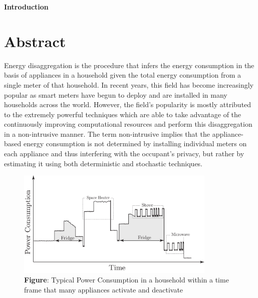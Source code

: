 \documentclass[landscape,fontscale=0.48,margin=2cm,paperwidth=135truecm,paperheight=89truecm]{baposter}
\begin{document}
\begin{poster}
\begin{posterbox}[column=0]{\LARGE \bfseries Introduction}
\section*{Abstract}
Energy disaggregation is the procedure that infers the energy consumption in the basis of appliances in a household given the total energy consumption from a single meter of that household. In recent years, this field has become increasingly popular as smart meters have begun to deploy and are installed in many households across the world. However, the field's popularity is mostly attributed to the extremely powerful techniques which are able to take advantage of the continuously improving computational resources and perform this disaggregation in a non-intrusive manner. The term non-intrusive implies that the appliance-based energy consumption is not determined by installing individual meters on each appliance and thus interfering with the occupant's privacy, but rather by estimating it using both deterministic and stochastic techniques.
\begin{figure}
\begin{center}
\includegraphics[width=0.85\textwidth]{Qualitative}
\caption*{\footnotesize  \textbf{Figure}: Typical Power Consumption in a household within a time frame that many appliances activate and deactivate} \vspace*{-1 cm}
\end{center}
\end{figure}


\end{posterbox}
\end{poster}
\end{document}
